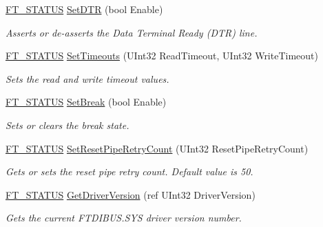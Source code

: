 \begin{DoxyCompactItemize}
\mbox{\hyperlink{class_f_t_d2_x_x___n_e_t_1_1_f_t_d_i_aabe20ad905cc4ccc1e35dd5b877d9a83}{F\+T\+\_\+\+S\+T\+A\+T\+US}} \mbox{\hyperlink{class_f_t_d2_x_x___n_e_t_1_1_f_t_d_i_a2f10252f4a5bf95b7467e1fda5b35e7e}{Set\+D\+TR}} (bool Enable)
\begin{DoxyCompactList}\small\item\em Asserts or de-\/asserts the Data Terminal Ready (D\+TR) line. \end{DoxyCompactList}\item 
\mbox{\hyperlink{class_f_t_d2_x_x___n_e_t_1_1_f_t_d_i_aabe20ad905cc4ccc1e35dd5b877d9a83}{F\+T\+\_\+\+S\+T\+A\+T\+US}} \mbox{\hyperlink{class_f_t_d2_x_x___n_e_t_1_1_f_t_d_i_a0aba1005c6aef6edadc8817844c09c66}{Set\+Timeouts}} (U\+Int32 Read\+Timeout, U\+Int32 Write\+Timeout)
\begin{DoxyCompactList}\small\item\em Sets the read and write timeout values. \end{DoxyCompactList}\item 
\mbox{\hyperlink{class_f_t_d2_x_x___n_e_t_1_1_f_t_d_i_aabe20ad905cc4ccc1e35dd5b877d9a83}{F\+T\+\_\+\+S\+T\+A\+T\+US}} \mbox{\hyperlink{class_f_t_d2_x_x___n_e_t_1_1_f_t_d_i_a1d2478c43baf448f2ba1919e4f15d96d}{Set\+Break}} (bool Enable)
\begin{DoxyCompactList}\small\item\em Sets or clears the break state. \end{DoxyCompactList}\item 
\mbox{\hyperlink{class_f_t_d2_x_x___n_e_t_1_1_f_t_d_i_aabe20ad905cc4ccc1e35dd5b877d9a83}{F\+T\+\_\+\+S\+T\+A\+T\+US}} \mbox{\hyperlink{class_f_t_d2_x_x___n_e_t_1_1_f_t_d_i_ac395991fa146bdfa6de574350441b2d5}{Set\+Reset\+Pipe\+Retry\+Count}} (U\+Int32 Reset\+Pipe\+Retry\+Count)
\begin{DoxyCompactList}\small\item\em Gets or sets the reset pipe retry count. Default value is 50. \end{DoxyCompactList}\item 
\mbox{\hyperlink{class_f_t_d2_x_x___n_e_t_1_1_f_t_d_i_aabe20ad905cc4ccc1e35dd5b877d9a83}{F\+T\+\_\+\+S\+T\+A\+T\+US}} \mbox{\hyperlink{class_f_t_d2_x_x___n_e_t_1_1_f_t_d_i_abdca05d9aec4b82efb3a4b08803968ef}{Get\+Driver\+Version}} (ref U\+Int32 Driver\+Version)
\begin{DoxyCompactList}\small\item\em Gets the current F\+T\+D\+I\+B\+U\+S.\+S\+YS driver version number. \end{DoxyCompactList}\item 

\end{DoxyCompactItemize}
